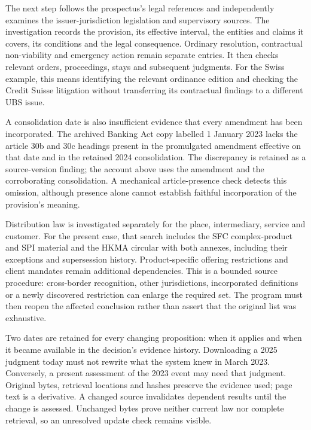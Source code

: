 The next step follows the prospectus's legal references and independently
examines the issuer-jurisdiction legislation and supervisory sources. The
investigation records the provision, its effective interval, the entities and
claims it covers, its conditions and the legal consequence. Ordinary resolution,
contractual non-viability and emergency action remain separate entries. It then
checks relevant orders, proceedings, stays and subsequent judgments. For the
Swiss example, this means identifying the relevant ordinance edition and
checking the Credit Suisse litigation without transferring its contractual
findings to a different UBS issue.

A consolidation date is also insufficient evidence that every amendment has
been incorporated. The archived Banking Act copy labelled 1 January 2023 lacks
the article 30b and 30c headings present in the promulgated amendment effective
on that date and in the retained 2024 consolidation. The discrepancy is retained
as a source-version finding; the account above uses the amendment and the
corroborating consolidation. A mechanical article-presence check detects this
omission, although presence alone cannot establish faithful incorporation of
the provision's meaning.

Distribution law is investigated separately for the place, intermediary,
service and customer. For the present case, that search includes the SFC
complex-product and SPI material and the HKMA circular with both annexes,
including their exceptions and supersession history. Product-specific offering
restrictions and client mandates remain additional dependencies. This is a
bounded source procedure: cross-border recognition, other jurisdictions,
incorporated definitions or a newly discovered restriction can enlarge the
required set. The program must then reopen the affected conclusion rather than
assert that the original list was exhaustive.

Two dates are retained for every changing proposition: when it applies and
when it became available in the decision's evidence history. Downloading a
2025 judgment today must not rewrite what the system knew in March 2023.
Conversely, a present assessment of the 2023 event may need that judgment.
Original bytes, retrieval locations and hashes preserve the evidence used;
page text is a derivative. A changed source invalidates dependent results until
the change is assessed. Unchanged bytes prove neither current law nor complete
retrieval, so an unresolved update check remains visible.

